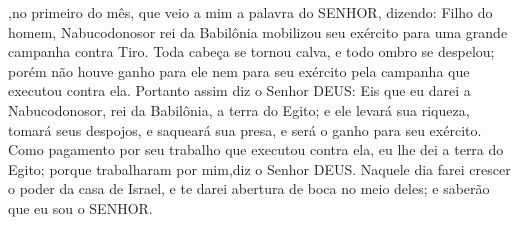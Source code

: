 {{} ,no primeiro
{} do mês, que veio a mim a palavra do SENHOR, dizendo:
Filho do homem, Nabucodonosor rei da Babilônia mobilizou seu exército para uma grande campanha contra Tiro. Toda cabeça se tornou calva, e todo ombro se despelou; porém não houve ganho para ele nem para seu exército pela campanha que executou contra ela.
Portanto assim diz o Senhor DEUS: Eis que eu darei a Nabucodonosor, rei da Babilônia, a terra do Egito; e ele levará sua riqueza, tomará seus despojos, e saqueará sua presa, e
{} será o ganho para seu exército.
Como pagamento por seu trabalho que executou contra ela, eu lhe dei a terra do Egito; porque trabalharam por mim,diz o Senhor DEUS.
Naquele dia farei crescer o poder
 da casa de Israel, e te darei abertura de boca no meio deles; e saberão que eu sou o SENHOR.

}
